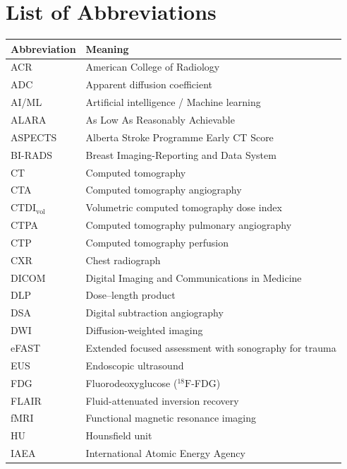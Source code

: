 \documentclass[12pt,oneside]{book}
\begin{document}
\setcounter{tocdepth}{0}
\tableofcontents

\chapter*{List of Abbreviations}

\begin{footnotesize}
\begin{longtable}{@{}ll@{}}
\toprule
\textbf{Abbreviation} & \textbf{Meaning} \\
\midrule
\endhead
ACR & American College of Radiology \\
ADC & Apparent diffusion coefficient \\
AI/ML & Artificial intelligence / Machine learning \\
ALARA & As Low As Reasonably Achievable \\
ASPECTS & Alberta Stroke Programme Early CT Score \\
BI-RADS & Breast Imaging-Reporting and Data System \\
CT & Computed tomography \\
CTA & Computed tomography angiography \\
$\text{CTDI}_{\text{vol}}$ & Volumetric computed tomography dose index \\
CTPA & Computed tomography pulmonary angiography \\
CTP & Computed tomography perfusion \\
CXR & Chest radiograph \\
DICOM & Digital Imaging and Communications in Medicine \\
DLP & Dose--length product \\
DSA & Digital subtraction angiography \\
DWI & Diffusion-weighted imaging \\
eFAST & Extended focused assessment with sonography for trauma \\
EUS & Endoscopic ultrasound \\
FDG & Fluorodeoxyglucose ($^{18}\text{F}$-FDG) \\
FLAIR & Fluid-attenuated inversion recovery \\
fMRI & Functional magnetic resonance imaging \\
HU & Hounsfield unit \\
IAEA & International Atomic Energy Agency \\

\end{longtable}
\end{footnotesize}
\end{document}
